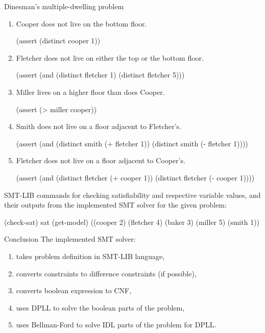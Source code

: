 \documentclass{beamer}
\begin{document}
\begin{frame}[fragile,t]
\begin{columns}[t,onlytextwidth]
\begin{column}{0.485\textwidth}
\begin{block}{Dinesman's multiple-dwelling problem}
\begin{enumerate}
				\item Cooper does not live on the bottom floor.
				\begin{smtlib}
					(assert (distinct cooper 1))
				\end{smtlib}
				
				\item Fletcher does not live on either the top or the bottom floor.
				\begin{smtlib}
					(assert (and (distinct fletcher 1)
					             (distinct fletcher 5)))
				\end{smtlib}
			
				\item Miller lives on a higher floor than does Cooper.
				\begin{smtlib}
					(assert (> miller cooper))
				\end{smtlib}
			
				\item Smith does not live on a floor adjacent to Fletcher's.
				\begin{smtlib}
					(assert (and (distinct smith (+ fletcher 1))
					             (distinct smith (- fletcher 1))))
				\end{smtlib}
			
				\item Fletcher does not live on a floor adjacent to Cooper's.
				\begin{smtlib}
					(assert (and (distinct fletcher (+ cooper 1))
					             (distinct fletcher (- cooper 1))))
				\end{smtlib}
			\end{enumerate}
		
			SMT-LIB commands for checking satisfiability and respective variable values, and their outputs from the implemented SMT solver for the given problem:
			\begin{smtlib}
				(check-sat)
				sat
				(get-model)
				((cooper 2) (fletcher 4) (baker 3) (miller 5) (smith 1))
			\end{smtlib}
		\end{block}
	
		\begin{block}{Conclusion}
			The implemented SMT solver:
			\begin{enumerate}
				\item takes problem definition in SMT-LIB language,
				\item converts constraints to difference constraints (if possible),
				\item converts boolean expression to CNF,
				\item uses DPLL to solve the boolean parts of the problem,
				\item uses Bellman-Ford to solve IDL parts of the problem for DPLL.
			\end{enumerate}


\end{block}
\end{column}
\end{columns}
\end{frame}
\end{document}
